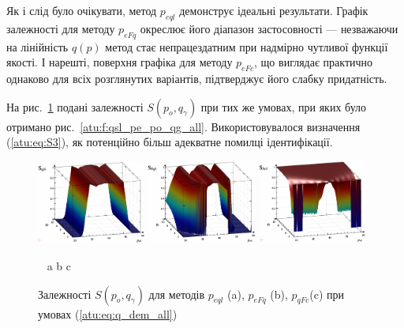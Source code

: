 Як і слід було очікувати, метод
$p_{eql}$ демонструє ідеальні результати. Графік залежності для
методу
$ p_{eFq} $ окреслює його діапазон застосовності --- незважаючи на
лінійність
$q(p)$ метод стає непрацездатним при надмірно чутливої
функції якості. І нарешті, поверхня графіка для методу
$ p_{eFc} $, що виглядає практично однаково для всіх розглянутих варіантів,
підтверджує його слабку придатність.


На рис.~\ref{atu:f:qsl_S_po_qg_all} подані залежності
$S (p_o, q_\gamma)$
при тих же умовах, при яких було отримано рис.~\ref{atu:f:qsl_pe_po_qg_all}.
Використовувалося визначення (\ref{atu:eq:S3}), як
потенційно більш адекватне помилці ідентифікації.

\begin{figure}[htb!]
  \begin{center}
    \includegraphics[width=0.32\textwidth]{p/qls_pe-p_po_qg_Sql_all_xl.png}
    \hfill
    \includegraphics[width=0.32\textwidth]{p/qls_pe-p_po_qg_SFq_all_xl.png}
    \hfill
    \includegraphics[width=0.32\textwidth]{p/qls_pe-p_po_qg_SFc_all_xl.png}
  \end{center}
  \vspace{-1.5ex}
  \begin{center}
    ~ \hfill a \hfill\hfill b \hfill\hfill c \hfill ~
  \end{center}
  \vspace{-2.5ex}
  \caption{Залежності $S(p_o,q_\gamma)$ для методів $p_{eql}$ (a), $p_{eFq}$ (b), $p_{qFc}$(c) при умовах (\ref{atu:eq:q_dem_all})}
  \label{atu:f:qsl_S_po_qg_all}
\end{figure}

